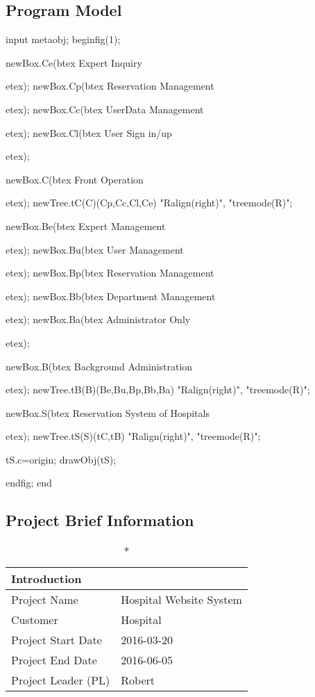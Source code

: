 \documentclass[a4paper,11pt]{article}
\begin{document}
\subsection{Program Model}
\begin{center}
\configure[mpggraphic][scale=.75]
\begin{mpdisplay}
input metaobj;
beginfig(1);

newBox.Ce(btex Expert Inquiry\strut etex);
newBox.Cp(btex Reservation Management\strut etex);
newBox.Cc(btex UserData Management\strut etex);
newBox.Cl(btex User Sign in/up\strut etex);

newBox.C(btex Front Operation\strut etex);
newTree.tC(C)(Cp,Cc,Cl,Ce) "Ralign(right)", "treemode(R)";

newBox.Be(btex Expert Management\strut etex);
newBox.Bu(btex User Management\strut etex);
newBox.Bp(btex Reservation Management\strut etex);
newBox.Bb(btex Department Management\strut etex);
newBox.Ba(btex Administrator Only\strut etex);

newBox.B(btex Background Administration\strut etex);
newTree.tB(B)(Be,Bu,Bp,Bb,Ba) "Ralign(right)", "treemode(R)";

newBox.S(btex Reservation System of Hospitals\strut etex);
newTree.tS(S)(tC,tB) "Ralign(right)", "treemode(R)";

tS.c=origin;
drawObj(tS);

endfig;
end
\end{mpdisplay}
\end{center}

\subsection{Project Brief Information}
\begin{center}
\begin{longtable}{|l|l|}
\caption*{Introduction} \\
\hline Project Name        & Hospital Website System \\
\hline Customer            & Hospital \\
\hline Project Start Date  & 2016-03-20 \\
\hline Project End Date    & 2016-06-05 \\
\hline Project Leader (PL) & Robert \\
\hline
\end{longtable}
\end{center}
\end{document}
